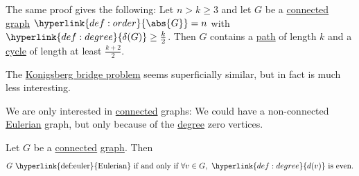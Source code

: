 \documentclass{article}
\begin{document}
\begin{remark}
    The same proof gives the following:
    Let $n > k \geq 3$ and let $G$ be a \hyperlink{def:components}{connected} \hyperlink{def:graph}{graph} $\hyperlink{def:order}{\abs{G}} = n$ with $\hyperlink{def:degree}{\delta(G)} \geq \frac{k}{2}$.
    Then $G$ contains a \hyperlink{def:path}{path} of length $k$ and a \hyperlink{def:cycle}{cycle} of length at least $\frac{k+2}{2}$.
\end{remark}

The \hyperlink{def:konig}{Konigsberg bridge problem} seems superficially similar, but in fact is much less interesting.

We are only interested in \hyperlink{def:components}{connected} graphs: We could have a non-connected \hyperlink{def:euler}{Eulerian} graph, but only because of the \hyperlink{def:degree}{degree} zero vertices.
\begin{center}
\end{center}

\begin{nprop}\label{thm:18}
    Let $G$ be a \hyperlink{def:components}{connected} \hyperlink{def:graph}{graph}. Then
    \begin{equation*}
        G\text{ \hyperlink{def:euler}{Eulerian} if and only if } \forall v \in G,\ \hyperlink{def:degree}{d(v)}\text{ is even.}
    \end{equation*}
\end{nprop}
\end{document}

